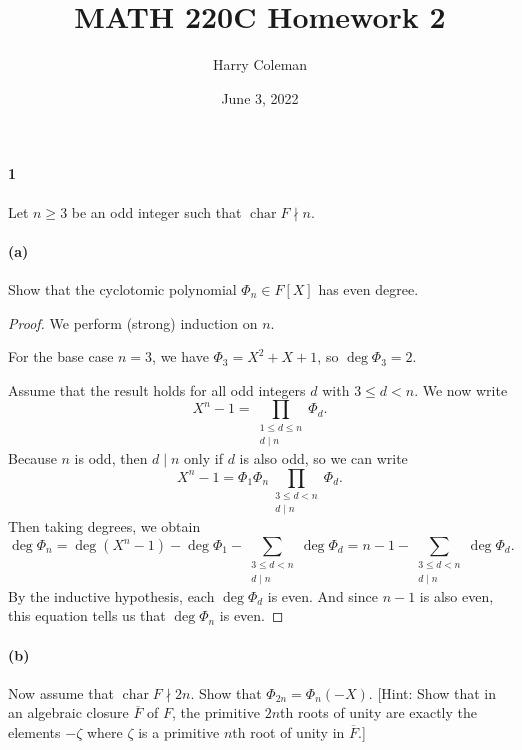 \documentclass[12pt]{article}
\renewcommand{\maketitle}{\thispagestyle{title}}
\newlength{\myparskip}
\newenvironment{fullbox}{\begin{lrbox}{\savefullbox}\begin{minipage}{\dimexpr\textwidth-2\fboxsep\relax}\setlength{\parskip}{\myparskip}}{\end{minipage}\end{lrbox}\framebox[\textwidth]{\usebox{\savefullbox}}}
\newenvironment{pbox}[1][]{\begin{fullbox}\def\temp{#1}\ifx\temp\empty\else\paragraph{#1}\phantom{}\fi}{\end{fullbox}}
\theoremstyle{definition}
\newcommand{\<}{\langle}
\renewcommand{\>}{\rangle}
\newcommand{\clo}{\overline}
\newcommand{\Char}{\operatorname{char}}
\begin{document}
\title{MATH 220C Homework 2}
\author{Harry Coleman}
\date{June 3, 2022}
\maketitle

\begin{pbox}[1]
    Let $n \geq 3$ be an odd integer such that $\Char F \nmid n$.
\end{pbox}

\begin{pbox}[(a)]
    Show that the cyclotomic polynomial $\Phi_n \in F[X]$ has even degree.
\end{pbox}

\begin{proof}
    We perform (strong) induction on $n$.

    For the base case $n = 3$, we have $\Phi_3 = X^2 + X + 1$, so $\deg\Phi_3 = 2$.

    Assume that the result holds for all odd integers $d$ with $3 \leq d < n$.
    We now write
    \[
        X^n - 1 = \prod_{\substack{1 \leq d \leq n \\ d \mid n}} \Phi_d.
    \]
    Because $n$ is odd, then $d \mid n$ only if $d$ is also odd, so we can write
    \[
        X^n - 1 = \Phi_1 \Phi_n \prod_{\substack{3 \leq d < n \\ d \mid n}} \Phi_d.
    \]
    Then taking degrees, we obtain
    \[
        \deg\Phi_n
            = \deg(X^n - 1) - \deg\Phi_1 - \sum_{\substack{3 \leq d < n \\ d \mid n}} \deg\Phi_d
            = n - 1 - \sum_{\substack{3 \leq d < n \\ d \mid n}} \deg\Phi_d.
    \]
    By the inductive hypothesis, each $\deg\Phi_d$ is even.
    And since $n - 1$ is also even, this equation tells us that $\deg\Phi_n$ is even.
\end{proof}

\begin{pbox}[(b)]
    Now assume that $\Char F \nmid 2n$.
    Show that $\Phi_{2n} = \Phi_n(-X)$.
    [Hint: Show that in an algebraic closure $\clo{F}$ of $F$, the primitive $2n$th roots of unity are exactly the elements $-\zeta$ where $\zeta$ is a primitive $n$th root of unity in $\clo{F}$.]
\end{pbox}
\end{document}
